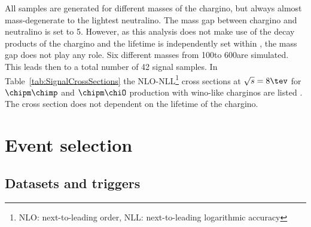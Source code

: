 All samples are generated for different masses of the chargino, but always almost mass-degenerate to the lightest neutralino.
The mass gap between chargino and neutralino is set to 5\gev.
However, as this analysis does not make use of the decay products of the chargino and the lifetime is independently set within \geant, the mass gap does not play any role.
Six different masses from 100\gev to 600\gev are simulated.
This leads then to a total number of 42 signal samples.
In Table~\ref{tab:SignalCrossSections} the NLO-NLL\footnote{NLO: next-to-leading order, NLL: next-to-leading logarithmic accuracy} cross sections at $\sqrt{s}=8\tev$ for $\chipm\chimp$ and $\chipm\chiO$ production 
with wino-like charginos are listed \cite{bib:SignalCrossSection_2012,bib:SignalCrossSection_2013}.
The cross section does not dependent on the lifetime of the chargino.
\renewcommand{\arraystretch}{1.5}
\begin{table}[h]
\centering
\caption{Simulated signal mass points with corresponding cross sections for wino-like charginos.}
\label{tab:SignalCrossSections}
\end{table}  
\section{Event selection}
\label{sec:EventSelection}
\subsection{Datasets and triggers}
\label{subsec:DatasetsAndTriggers}

